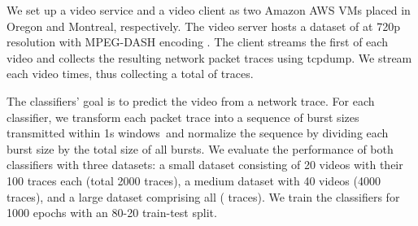 We set up a video service and a video client as two Amazon AWS VMs placed in
Oregon and Montreal, respectively. The video server hosts a dataset of
 at 720p resolution with MPEG-DASH encoding
\cite{mpeg-dash}. The client streams the first  of each video
 and collects the resulting network packet traces using
tcpdump.
We stream each video  times, thus collecting a total of
 traces.

%
%
The classifiers' goal is to predict the video from a network trace.
%
For each classifier, we transform each packet trace into a sequence of burst
sizes transmitted within 1s windows~and normalize the sequence by dividing
each burst size by the total size of all bursts.
%
We evaluate the performance of both classifiers with three datasets: a small
dataset consisting of 20 videos with their 100 traces each (\ie total
2000 traces), a medium
dataset with 40 videos (4000 traces),  and a large dataset comprising
all  ( traces).
We train the classifiers for 1000 epochs with an 80-20 train-test split.
